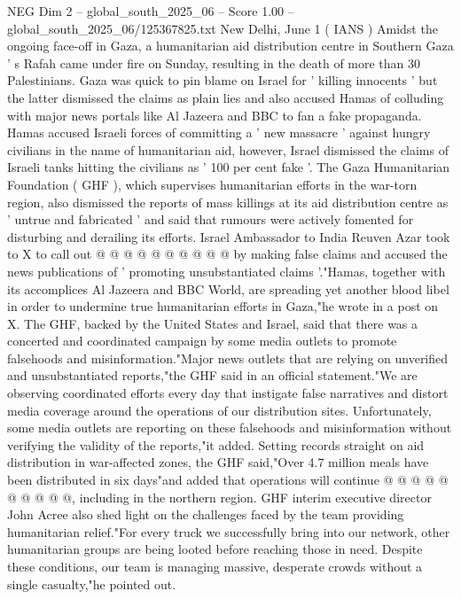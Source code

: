 \begin{textsample}{NEG Dim 2 – global\_south\_2025\_06 – Score 1.00 – global\_south\_2025\_06/125367825.txt}  \label{ex:f2_neg_199}
New Delhi, June 1 ( IANS ) Amidst the ongoing face-off in Gaza, a humanitarian aid distribution centre in Southern Gaza ' s Rafah came under fire on Sunday, resulting in the death of more than 30 Palestinians.
Gaza was quick to pin blame on Israel for ' killing innocents ' but the latter dismissed the claims as plain lies and also accused Hamas of colluding with major news portals like Al Jazeera and BBC to fan a fake propaganda.
Hamas accused Israeli forces of committing a ' new massacre ' against hungry civilians in the name of humanitarian aid, however, Israel dismissed the claims of Israeli tanks hitting the civilians as ' 100 per cent fake '.
The Gaza Humanitarian Foundation ( GHF ), which supervises humanitarian efforts in the war-torn region, also dismissed the reports of mass killings at its aid distribution centre as ' untrue and fabricated ' and said that rumours were actively fomented for disturbing and derailing its efforts.
Israel Ambassador to India Reuven Azar took to X to call out @ @ @ @ @ @ @ @ @ @ by making false claims and accused the news publications of ' promoting unsubstantiated claims '."Hamas, together with its accomplices Al Jazeera and BBC World, are spreading yet another blood libel in order to undermine true humanitarian efforts in Gaza,"he wrote in a post on X.
The GHF, backed by the United States and Israel, said that there was a concerted and coordinated campaign by some media outlets to promote falsehoods and misinformation."Major news outlets that are relying on unverified and unsubstantiated reports,"the GHF said in an official statement."We are observing coordinated efforts every day that instigate false narratives and distort media coverage around the operations of our distribution sites.
Unfortunately, some media outlets are reporting on these falsehoods and misinformation without verifying the validity of the reports,"it added.
Setting records straight on aid distribution in war-affected zones, the GHF said,"Over 4.7 million meals have been distributed in six days"and added that operations will continue @ @ @ @ @ @ @ @ @ @, including in the northern region.
GHF interim executive director John Acree also shed light on the challenges faced by the team providing humanitarian relief."For every truck we successfully bring into our network, other humanitarian groups are being looted before reaching those in need.
Despite these conditions, our team is managing massive, desperate crowds without a single casualty,"he pointed out.

\end{textsample}
